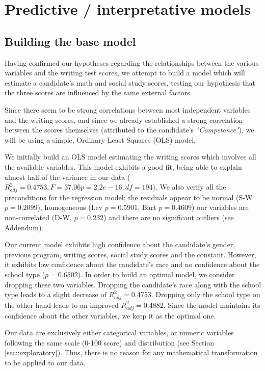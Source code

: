 \documentclass[10pt, a4paper]{article}
\begin{document}
	
	\section{Predictive / interpretative models}
	\label{sec::models}
	
	\subsection{Building the base model}
	Having confirmed our hypotheses regarding the relationships between the various variables and the writing test scores, we attempt to build a model which will estimate a candidate's math and social study scores, testing our hypothesis that the three scores are influenced by the same external factors. 
	
	Since there seem to be strong correlations between most independent variables and the writing scores, and since we already established a strong correlation between the scores themselves (attributed to the candidate's \textit{"Competence"}), we will be using a simple, Ordinary Least Squares (OLS) model.
	
	We initially build an OLS model estimating the writing scores which involves all the available variables. This model exhibits a good fit, being able to explain almost half of the variance in our data ($R^2_{adj} = 0.4753, F= 37.06 p=2.2e-16, df=194$). We also verify all the preconditions for the regression model; the residuals appear to be normal (S-W $p = 0.2099$), homogeneous (Lev $p = 0.5901$, Bart $p = 0.4609$) our variables are non-correlated (D-W, $p=0.232$) and there are no significant outliers (see Addendum).
	
	Our current model exhibits high confidence about the candidate's gender, previous program, writing scores, social study scores and the constant. However, it exhibits low confidence about the candidate's race and no confidence about the school type ($p=0.6502$). In order to build an optimal model, we consider dropping these two variables. Dropping the candidate's race along with the school type leads to a slight decrease of $R^2_{adj} = 0.4753$. Dropping only the school type on the other hand leads to an improved $R^2_{adj} = 0.4882$. Since the model maintains its confidence about the other variables, we keep it as the optimal one.
	
	Our data are exclusively either categorical variables, or numeric variables following the same scale (0-100 score) and distribution (see Section \ref{sec::exploratory}). Thus, there is no reason for any mathematical transformation to be applied to our data.
	
\end{document}
